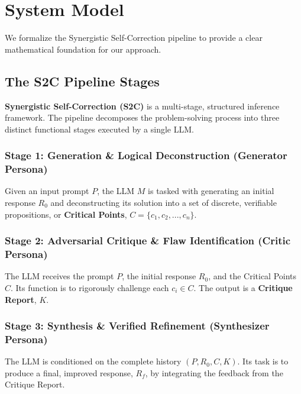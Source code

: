\documentclass[conference]{IEEEtran}
\begin{document}
\section{System Model}
We formalize the Synergistic Self-Correction pipeline to provide a clear mathematical foundation for our approach.

\subsection{The S2C Pipeline Stages}
\textbf{Synergistic Self-Correction (S2C)} is a multi-stage, structured inference framework. The pipeline decomposes the problem-solving process into three distinct functional stages executed by a single LLM.

\subsubsection{Stage 1: Generation \& Logical Deconstruction (Generator Persona)}
Given an input prompt $P$, the LLM $M$ is tasked with generating an initial response $R_0$ and deconstructing its solution into a set of discrete, verifiable propositions, or \textbf{Critical Points}, $C = \{c_1, c_2, ..., c_n\}$.

\subsubsection{Stage 2: Adversarial Critique \& Flaw Identification (Critic Persona)}
The LLM receives the prompt $P$, the initial response $R_0$, and the Critical Points $C$. Its function is to rigorously challenge each $c_i \in C$. The output is a \textbf{Critique Report}, $K$.

\subsubsection{Stage 3: Synthesis \& Verified Refinement (Synthesizer Persona)}
The LLM is conditioned on the complete history $(P, R_0, C, K)$. Its task is to produce a final, improved response, $R_f$, by integrating the feedback from the Critique Report.
\end{document}
